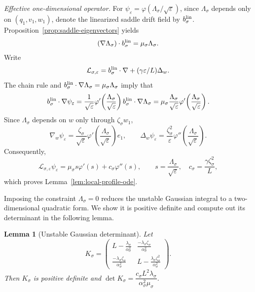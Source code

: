 \documentclass[11pt]{article}
\numberwithin{equation}{section}
\theoremstyle{plain}
\newtheorem{lemma}[theorem]{Lemma}
\theoremstyle{definition}
\theoremstyle{remark}
\newcommand{\eps}{\varepsilon}
\newcommand{\calL}{\mathcal L}
\begin{document}
\emph{Effective one-dimensional operator.}  For
$\psi_\eps=\varphi(\Lambda_\sigma/\sqrt\eps)$, since $\Lambda_\sigma$ depends
only on $(q_1,v_1,w_1)$, denote the linearized saddle drift field by
$b_\sigma^{\rm lin}$.  Proposition~\ref{prop:saddle-eigenvectors} yields
\[
(\nabla\Lambda_\sigma)\cdot b_\sigma^{\rm lin}=\mu_\sigma\Lambda_\sigma.
\]
Write
\[
\calL_{\sigma,\eps}=b_\sigma^{\rm lin}\cdot\nabla+(\gamma\eps/L)\Delta_w.
\]
The chain rule and $b_\sigma^{\rm lin}\cdot\nabla\Lambda_\sigma
=\mu_\sigma\Lambda_\sigma$ imply that
\[
b_\sigma^{\rm lin}\cdot\nabla\psi_\eps
=\frac1{\sqrt\eps}
\varphi'\!\left(\frac{\Lambda_\sigma}{\sqrt\eps}\right)
b_\sigma^{\rm lin}\cdot\nabla\Lambda_\sigma
=\mu_\sigma\frac{\Lambda_\sigma}{\sqrt\eps}
\varphi'\!\left(\frac{\Lambda_\sigma}{\sqrt\eps}\right).
\]
Since $\Lambda_\sigma$ depends on $w$ only through
$\zeta_\sigma w_1$,
\[
\nabla_w\psi_\eps
=\frac{\zeta_\sigma}{\sqrt\eps}
\varphi'\!\left(\frac{\Lambda_\sigma}{\sqrt\eps}\right)e_1,
\qquad
\Delta_w\psi_\eps
=\frac{\zeta_\sigma^2}{\eps}
\varphi''\!\left(\frac{\Lambda_\sigma}{\sqrt\eps}\right).
\]
Consequently,
\[
\calL_{\sigma,\eps}\psi_\eps
=\mu_\sigma s\varphi'(s)+c_\sigma\varphi''(s),
\qquad
s=\frac{\Lambda_\sigma}{\sqrt\eps},
\quad c_\sigma=\frac{\gamma\zeta_\sigma^2}{L},
\]
which proves Lemma~\ref{lem:local-profile-ode}.

Imposing the constraint $\Lambda_\sigma=0$ reduces the unstable
Gaussian integral to a two-dimensional quadratic form.  We show it is positive definite and compute out its
determinant in the following lemma.

\begin{lemma}[Unstable Gaussian determinant]
\label{lem:unstable-gaussian-determinant}
Let
\[
K_\sigma=
\begin{pmatrix}
L-\frac{\lambda_\sigma}{\alpha_\sigma^2} & \frac{-\lambda_\sigma\zeta_\sigma}{\alpha_\sigma^2}\\
\frac{-\lambda_\sigma\zeta_\sigma}{\alpha_\sigma^2} & L-\frac{\lambda_\sigma\zeta_\sigma^2}{\alpha_\sigma^2}
\end{pmatrix}.
\]
Then $K_\sigma$ is positive definite and
$\det K_\sigma=\dfrac{c_\sigma L^2\lambda_\sigma}{\alpha_\sigma^2\mu_\sigma}$.
\end{lemma}
\end{document}
